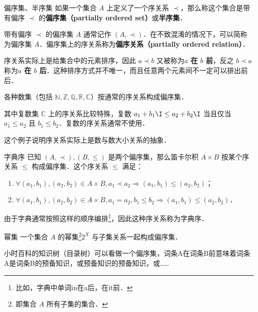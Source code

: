 \begin{definition}{偏序集、半序集}
如果一个集合 $A$ 上定义了一个序关系 $\prec$，那么称这个集合是带有偏序 $\prec$ 的\textbf{偏序集（partially ordered set）}或\textbf{半序集}．
\end{definition}

带有偏序 $\prec$ 的偏序集 $A$ 通常记作 $(A,\prec)$．在不致混淆的情况下，可以简称为偏序集 $A$．偏序集上的序关系称为\textbf{偏序关系（partially ordered relation）}．

序关系实际上是给集合中的元素排序，因此 $a \prec b$ 又被称为\textbf{$a$ 在 $b$ 前}，反之 $b \prec a$ 称为\textbf{$a$ 在 $b$ 后}．这种排序方式并不唯一，而且任意两个元素间不一定可以排出前后．

\begin{example}{}
各种数集（包括 $\mathbb{N},\mathbb{Z},\mathbb{Q},\mathbb{R},\mathbb{C}$）按通常的序关系构成偏序集．

其中复数集 $\mathbb{C}$ 上的序关系比较特殊，复数 $a_1+b_1\I \leq a_2+b_2\I$ 当且仅当 $a_1\leq a_2$ 且 $b_1 \leq b_2$．复数的序关系通常不使用．
\end{example}

这个例子说明序关系实际上是数与数大小关系的抽象．

\begin{example}{字典序}\label{Relat_ex1}
已知 $(A,\prec),(B,\leq)$ 是两个偏序集，那么笛卡尔积 $A\times B$ 按某个序关系 $\leqslant$ 构成偏序集．这个序关系 $\leqslant$ 满足：
\begin{enumerate}
\item $\forall(a_1,b_1),(a_2,b_2) \in A\times B, a_1\prec a_2 \Rightarrow (a_1,b_1)\leqslant(a_2,b_2)$；
\item $\forall(a_1,b_1),(a_2,b_2) \in A\times B, a_1=a_2, b_1\leq b_2 \Rightarrow (a_1,b_1) \leqslant (a_2, b_2)$．
\end{enumerate}

由于字典通常按照这样的顺序编排\footnote{比如，字典中单词in在a后，在it前．}，因此这种序关系称为字典序．
\end{example}
\begin{example}{幂集}
一个集合 $A$ 的幂集\footnote{即集合 $A$ 所有子集的集合．}$2^X$ 与子集关系一起构成偏序集．
\end{example}

\begin{example}{}
小时百科的知识树（目录树）可以看做一个偏序集，词条A在词条B前意味着词条A是词条B的预备知识，或预备知识的预备知识，或……
\end{example}

